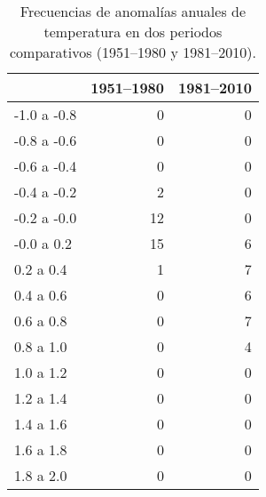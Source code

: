 \begin{table}
\caption{Frecuencias de anomalías anuales de temperatura en dos periodos comparativos (1951--1980 y 1981--2010).}
\label{tab:frecuencias}
\begin{tabular}{lrr}
\toprule
 & 1951–1980 & 1981–2010 \\
\midrule
-1.0 a -0.8 & 0 & 0 \\
-0.8 a -0.6 & 0 & 0 \\
-0.6 a -0.4 & 0 & 0 \\
-0.4 a -0.2 & 2 & 0 \\
-0.2 a -0.0 & 12 & 0 \\
-0.0 a 0.2 & 15 & 6 \\
0.2 a 0.4 & 1 & 7 \\
0.4 a 0.6 & 0 & 6 \\
0.6 a 0.8 & 0 & 7 \\
0.8 a 1.0 & 0 & 4 \\
1.0 a 1.2 & 0 & 0 \\
1.2 a 1.4 & 0 & 0 \\
1.4 a 1.6 & 0 & 0 \\
1.6 a 1.8 & 0 & 0 \\
1.8 a 2.0 & 0 & 0 \\
\bottomrule
\end{tabular}
\end{table}
